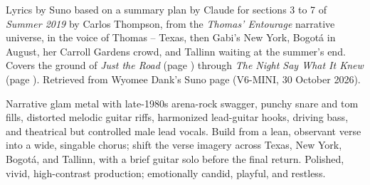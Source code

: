 
\label{sec:noted-and-continued}
\begin{notes}
Lyrics by Suno based on a summary plan by Claude for sections 3 to 7 of \emph{Summer 2019} by Carlos Thompson, from the \emph{Thomas' Entourage} narrative universe, in the voice of Thomas -- Texas, then Gabi's New York, Bogotá in August, her Carroll Gardens crowd, and Tallinn waiting at the summer's end. Covers the ground of \emph{Just the Road} (page \pageref{sec:just-the-road}) through \emph{The Night Say What It Knew} (page \pageref{sec:the-night-say-what-it-knew}). Retrieved from Wyomee Dank's Suno page (V6-MINI, 30 October 2026).
\end{notes}
\begin{style}
Narrative glam metal with late-1980s arena-rock swagger, punchy snare and tom fills, distorted melodic guitar riffs, harmonized lead-guitar hooks, driving bass, and theatrical but controlled male lead vocals. Build from a lean, observant verse into a wide, singable chorus; shift the verse imagery across Texas, New York, Bogotá, and Tallinn, with a brief guitar solo before the final return. Polished, vivid, high-contrast production; emotionally candid, playful, and restless.
\end{style}
